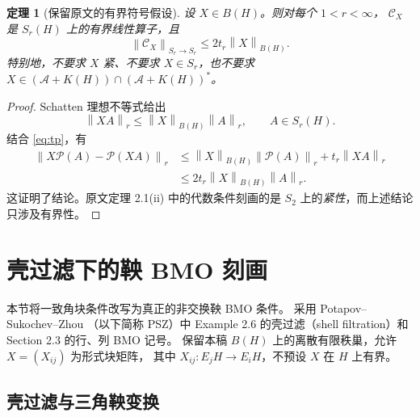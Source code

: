 \documentclass[UTF8,11pt,a4paper,fontset=fandol]{ctexart}
\newtheorem{theorem}{定理}[section]
\theoremstyle{remark}
\newcommand{\BH}{B(H)}
\newcommand{\PP}{\mathcal P}
\newcommand{\Alg}{\mathcal A}
\newcommand{\CC}{\mathcal C}
\newcommand{\norm}[1]{\left\lVert #1\right\rVert}
\numberwithin{equation}{section}
\begin{document}
\begin{theorem}[保留原文的有界符号假设]\label{thm:bounded}
设 $X\in\BH$。则对每个 $1<r<\infty$，
$\CC_X$ 是 $S_r(H)$ 上的有界线性算子，且
\begin{equation}\label{eq:easybound}
 \norm{\CC_X}_{S_r\to S_r}\leq 2t_r\norm{X}_{\BH}.
\end{equation}
特别地，不要求 $X$ 紧、不要求 $X\in S_r$，也不要求
$X\in(\Alg+K(H))\cap(\Alg+K(H))^*$。
\end{theorem}

\begin{proof}
Schatten 理想不等式给出
\[
 \norm{XA}_r\leq\norm{X}_{\BH}\norm{A}_r,
 \qquad A\in S_r(H).
\]
结合 \eqref{eq:tp}，有
\begin{align*}
 \norm{X\PP(A)-\PP(XA)}_r
 &\leq\norm{X}_{\BH}\norm{\PP(A)}_r
       +t_r\norm{XA}_r\\
 &\leq 2t_r\norm{X}_{\BH}\norm{A}_r.
\end{align*}
这证明了结论。原文定理 2.1(ii) 中的代数条件刻画的是
$S_2$ 上的\emph{紧性}，而上述结论只涉及有界性。
\end{proof}

\section{壳过滤下的鞅 BMO 刻画}\label{sec:martingale}

本节将一致角块条件改写为真正的非交换鞅 BMO 条件。
采用 Potapov--Sukochev--Zhou \cite{PSZ}（以下简称 PSZ）中
Example 2.6 的壳过滤（shell filtration）和 Section 2.3 的行、列 BMO 记号。
保留本稿 $B(H)$ 上的离散有限秩巢，允许 $X=(X_{ij})$ 为形式块矩阵，
其中 $X_{ij}:E_jH\to E_iH$，不预设 $X$ 在 $H$ 上有界。

\subsection{壳过滤与三角鞅变换}
\end{document}
